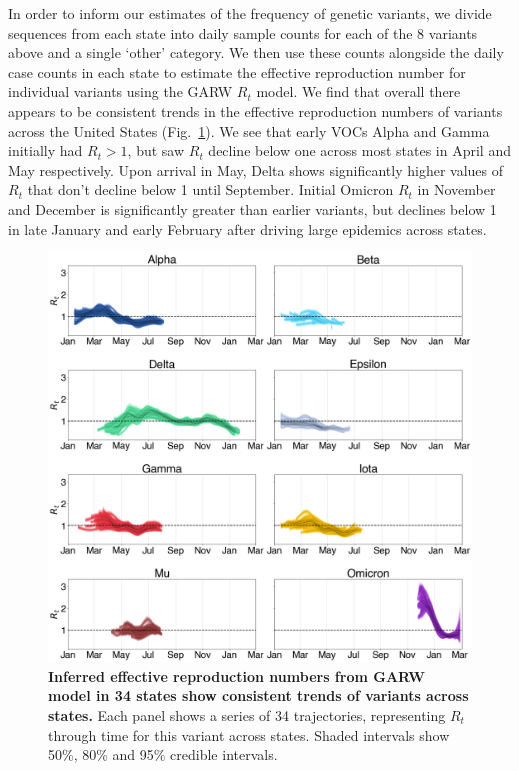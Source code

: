 In order to inform our estimates of the frequency of genetic variants, we divide sequences from each state into daily sample counts for each of the 8 variants above and a single `other' category.
We then use these counts alongside the daily case counts in each state to estimate the effective reproduction number for individual variants using the GARW $R_{t}$ model.
We find that overall there appears to be consistent trends in the effective reproduction numbers of variants across the United States (Fig.\ \ref{fig:rt_consensus}).
We see that early VOCs Alpha and Gamma initially had $R_t>1$, but saw $R_t$ decline below one across most states in April and May respectively.
Upon arrival in May, Delta shows significantly higher values of $R_t$ that don't decline below 1 until September.
Initial Omicron $R_t$ in November and December is significantly greater than earlier variants, but declines below 1 in late January and early February after driving large epidemics across states.

\begin{figure}[h!]
  \centering
  \includegraphics[width=\linewidth]{figs/rt_consensus.png}
  \caption{\textbf{Inferred effective reproduction numbers from GARW model in 34 states show consistent trends of variants across states.}
  Each panel shows a series of 34 trajectories, representing $R_t$ through time for this variant across states.
  Shaded intervals show 50\%, 80\% and 95\% credible intervals.
  }
  \label{fig:rt_consensus}
\end{figure}


